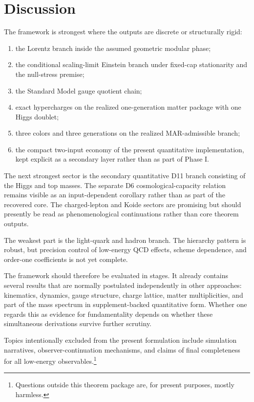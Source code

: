 \documentclass[11pt]{article}
\begin{document}
\section{Discussion}

The framework is strongest where the outputs are discrete or structurally rigid:
\begin{enumerate}[leftmargin=2em]
\item the Lorentz branch inside the assumed geometric modular phase;
\item the conditional scaling-limit Einstein branch under fixed-cap stationarity and the null-stress premise;
\item the Standard Model gauge quotient chain;
\item exact hypercharges on the realized one-generation matter package with one Higgs doublet;
\item three colors and three generations on the realized MAR-admissible branch;
\item the compact two-input economy of the present quantitative implementation, kept explicit as a secondary layer rather than as part of Phase I.
\end{enumerate}

The next strongest sector is the secondary quantitative D11 branch consisting of the Higgs and top masses. The separate D6 cosmological-capacity relation remains visible as an input-dependent corollary rather than as part of the recovered core. The charged-lepton and Koide sectors are promising but should presently be read as phenomenological continuations rather than core theorem outputs.

The weakest part is the light-quark and hadron branch. The hierarchy pattern is robust, but precision control of low-energy QCD effects, scheme dependence, and order-one coefficients is not yet complete.

The framework should therefore be evaluated in stages. It already contains several results that are normally postulated independently in other approaches: kinematics, dynamics, gauge structure, charge lattice, matter multiplicities, and part of the mass spectrum in supplement-backed quantitative form. Whether one regards this as evidence for fundamentality depends on whether these simultaneous derivations survive further scrutiny.

Topics intentionally excluded from the present formulation include simulation narratives, observer-continuation mechanisms, and claims of final completeness for all low-energy observables.\footnote{Questions outside this theorem package are, for present purposes, mostly harmless.}
\end{document}
